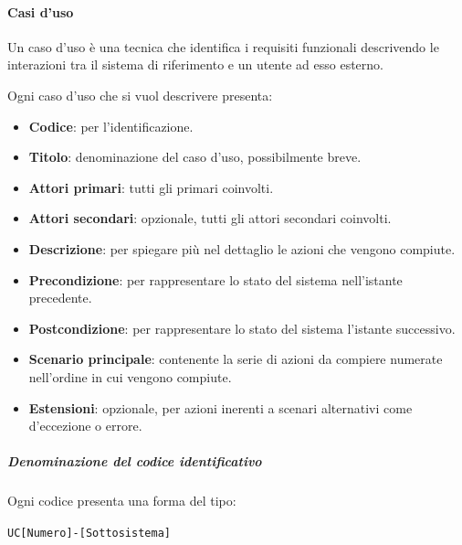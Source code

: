 		\paragraph{Casi d'uso}\label{PP:Sviluppo:AdR:CasiUso}
		Un caso d'uso è una tecnica che identifica i requisiti funzionali descrivendo le interazioni tra il sistema di riferimento e un utente ad esso esterno.\par
		Ogni caso d'uso che si vuol descrivere presenta:
		\begin{itemize}
		 	\item \textbf{Codice}: per l'identificazione.
		 	\item \textbf{Titolo}: denominazione del caso d'uso, possibilmente breve.
		 	\item \textbf{Attori primari}: tutti gli  primari coinvolti.
		 	\item \textbf{Attori secondari}: opzionale, tutti gli attori secondari coinvolti.
		 	\item \textbf{Descrizione}: per spiegare più nel dettaglio le azioni che vengono compiute.
		 	\item \textbf{Precondizione}: per rappresentare lo stato del sistema nell'istante precedente.
		 	\item \textbf{Postcondizione}: per rappresentare lo stato del sistema l'istante successivo.
		 	\item \textbf{Scenario principale}: contenente la serie di azioni da compiere numerate nell'ordine in cui vengono compiute.
		 	\item \textbf{Estensioni}: opzionale, per azioni inerenti a scenari alternativi come d'eccezione o errore.
		\end{itemize}

		\subparagraph{Denominazione del codice identificativo}
		Ogni codice presenta una forma del tipo:
		\begin{center}
			\texttt{UC[Numero]-[Sottosistema]}
		\end{center}

